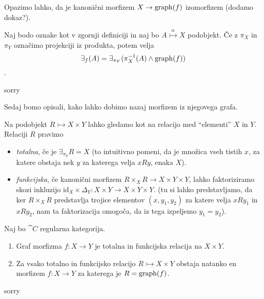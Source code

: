 \documentclass[../kategoricna_logika.tex]{subfiles}
\begin{document}
Opazimo lahko, da je kanonični morfizem $X \to \operatorname{graph}(f)$ izomorfizem (dodamo dokaz?).
\begin{lema}
  Naj bodo oznake kot v zgornji definiciji in naj bo $A \overset{\alpha}{\rightarrowtail} X$ podobjekt. Če z $\pi_X$ in $\pi_Y$ označimo projekciji iz produkta, potem velja
  $$\exists_f(A) = \exists_{\pi_Y}(\pi_X^{-1}(A) \wedge \operatorname{graph}(f))$$.
\end{lema}
\begin{dokaz}
  sorry
\end{dokaz}

Sedaj bomo opisali, kako lahko dobimo nazaj morfizem iz njegovega grafa.
\begin{definicija}
  Na podobjekt $R \rightarrowtail X \times Y$ lahko gledamo kot na relacijo med ``elementi'' $X$ in $Y$. Relaciji $R$ pravimo 
  \begin{itemize}
    \item \emph{totalna}, če je $\exists_{\pi_Y}R = X$ (to intuitivno pomeni, da je množica vseh tistih $x$, za katere obstaja nek $y$ za katerega velja $xRy$, enaka $X$).
    \item \emph{funkcijska}, če kanonični morfizem $R \times_X R \to X \times Y \times Y$, lahko faktoriziramo skozi inkluzijo $\mathrm{id}_X \times \Delta_Y : X \times Y \to X \times Y \times Y$. (tu si lahko predstavljamo, da ker $R \times_X R$ predstavlja trojice elementov $(x, y_1, y_2)$ za katere velja $xRy_1$ in $xRy_2$, nam ta faktorizacija omogoča, da iz tega izpeljemo $y_1 = y_2$).
  \end{itemize}
\end{definicija}
\begin{lema}
  Naj bo $\cat{C}$ regularna kategorija.
  \begin{enumerate}[label=(\roman*)]
    \item Graf morfizma $f : X \to Y$ je totalna in funkcijska relacija na $X \times Y$.
    \item Za vsako totalno in funkcijsko relacijo $R \rightarrowtail X \times Y$ obstaja natanko en morfizem $f : X \to Y$ za katerega je $R = \operatorname{graph}(f)$.
  \end{enumerate}
\end{lema}
\begin{dokaz}
  sorry
\end{dokaz}
\end{document}
